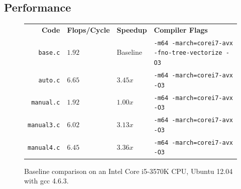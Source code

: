 \documentclass[portrait,a4paper]{article}
\begin{document}
\subsection{Performance}

\begin{figure}[H]
\centering
\begin{tabular}{rlll}
    \textbf{Code} & \textbf{Flops/Cycle} & \textbf{Speedup} & \textbf{Compiler Flags}\\ 
        \texttt{base.c} & $1.92$ & Baseline & \texttt{-m64 -march=corei7-avx -fno-tree-vectorize -O3}\\
    \texttt{auto.c} & $6.65$ & $3.45x$ & \texttt{-m64 -march=corei7-avx -O3}\\
    \texttt{manual.c}& $1.92$ & $1.00x$ & \texttt{-m64 -march=corei7-avx -O3}\\
    \texttt{manual3.c}& $6.02$ & $3.13x$ & \texttt{-m64 -march=corei7-avx -O3}\\
    \texttt{manual4.c}& $6.45$ & $3.36x$ & \texttt{-m64 -march=corei7-avx -O3}
\end{tabular}
    \caption{Baseline comparison on an Intel Core i5-3570K CPU, Ubuntu 12.04 with gcc 4.6.3.}\label{vectorization_performance}
\end{figure}
\end{document}
